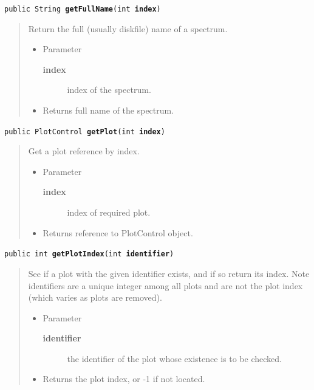\documentclass[twoside,11pt]{article}
\renewcommand{\_}{\texttt{\symbol{95}}}
\newcommand{\method}[1]{\texttt{#1}}
\newenvironment{desc}{\begin{quote}}{\end{quote}}
\begin{document}
\method{public String \textbf{getFullName}(\texttt{int} \textbf{index})\label{l279}\label{l280}}
\begin{desc}Return the full (usually diskfile) name of a spectrum.
\begin{itemize}
\item{Parameter
  \begin{description}
   \item[\textbf{index}]{index of the spectrum.}
  \end{description}}
\end{itemize}
\begin{itemize}
\item{Returns full name of the spectrum. }
\end{itemize}
\end{desc}

\method{public PlotControl \textbf{getPlot}(\texttt{int} \textbf{index})\label{l281}\label{l282}}
\begin{desc}Get a plot reference by index.
\begin{itemize}
\item{Parameter
  \begin{description}
   \item[\textbf{index}]{index of required plot.}
  \end{description}}
\end{itemize}
\begin{itemize}
\item{Returns reference to PlotControl object. }
\end{itemize}
\end{desc}

\method{public int \textbf{getPlotIndex}(\texttt{int} \textbf{identifier})\label{l283}\label{l284}}
\begin{desc}See if a plot with the given identifier exists, and if so
 return its index. Note identifiers are a unique integer among
 all plots and are not the plot index (which varies as plots are
 removed).
\begin{itemize}
\item{Parameter
  \begin{description}
   \item[\textbf{identifier}]{the identifier of the plot whose existence is
                   to be checked.}
  \end{description}}
\end{itemize}
\begin{itemize}
\item{Returns the plot index, or -1 if not located. }
\end{itemize}
\end{desc}
\end{document}
